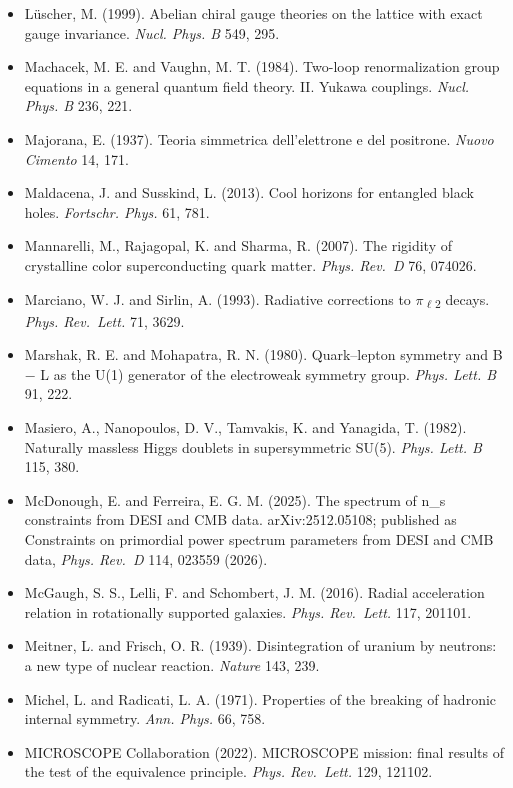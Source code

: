 \documentclass[
  11pt,
]{article}
\begin{document}
\begin{itemize}
  Lüscher, M. (1998). Exact chiral symmetry on the lattice and the Ginsparg--Wilson relation. \emph{Phys. Lett. B} 428, 342.
\item
  Lüscher, M. (1999). Abelian chiral gauge theories on the lattice with exact gauge invariance. \emph{Nucl. Phys. B} 549, 295.
\item
  Machacek, M. E. and Vaughn, M. T. (1984). Two-loop renormalization group equations in a general quantum field theory. II. Yukawa couplings. \emph{Nucl. Phys. B} 236, 221.
\item
  Majorana, E. (1937). Teoria simmetrica dell'elettrone e del positrone. \emph{Nuovo Cimento} 14, 171.
\item
  Maldacena, J. and Susskind, L. (2013). Cool horizons for entangled black holes. \emph{Fortschr. Phys.} 61, 781.
\item
  Mannarelli, M., Rajagopal, K. and Sharma, R. (2007). The rigidity of crystalline color superconducting quark matter. \emph{Phys. Rev.~D} 76, 074026.
\item
  Marciano, W. J. and Sirlin, A. (1993). Radiative corrections to \ensuremath{\pi}\textsubscript{\ensuremath{\ell}2} decays. \emph{Phys. Rev.~Lett.} 71, 3629.
\item
  Marshak, R. E. and Mohapatra, R. N. (1980). Quark--lepton symmetry and B \ensuremath{-} L as the U(1) generator of the electroweak symmetry group. \emph{Phys. Lett. B} 91, 222.
\item
  Masiero, A., Nanopoulos, D. V., Tamvakis, K. and Yanagida, T. (1982). Naturally massless Higgs doublets in supersymmetric SU(5). \emph{Phys. Lett. B} 115, 380.
\item
  McDonough, E. and Ferreira, E. G. M. (2025). The spectrum of n\_s constraints from DESI and CMB data. arXiv:2512.05108; published as Constraints on primordial power spectrum parameters from DESI and CMB data, \emph{Phys. Rev.~D} 114, 023559 (2026).
\item
  McGaugh, S. S., Lelli, F. and Schombert, J. M. (2016). Radial acceleration relation in rotationally supported galaxies. \emph{Phys. Rev.~Lett.} 117, 201101.
\item
  Meitner, L. and Frisch, O. R. (1939). Disintegration of uranium by neutrons: a new type of nuclear reaction. \emph{Nature} 143, 239.
\item
  Michel, L. and Radicati, L. A. (1971). Properties of the breaking of hadronic internal symmetry. \emph{Ann. Phys.} 66, 758.
\item
  MICROSCOPE Collaboration (2022). MICROSCOPE mission: final results of the test of the equivalence principle. \emph{Phys. Rev.~Lett.} 129, 121102.

\end{itemize}
\end{document}
